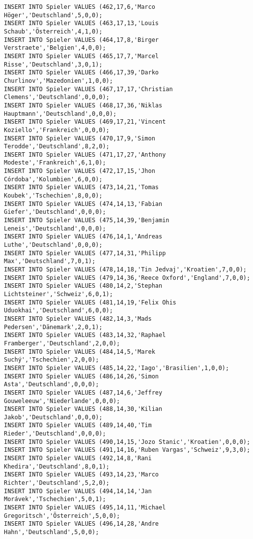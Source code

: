 \documentclass{bschlangaul-aufgabe}
\begin{document}
\begin{verbatim}
INSERT INTO Spieler VALUES (462,17,6,'Marco Höger','Deutschland',5,0,0);
INSERT INTO Spieler VALUES (463,17,13,'Louis Schaub','Österreich',4,1,0);
INSERT INTO Spieler VALUES (464,17,8,'Birger Verstraete','Belgien',4,0,0);
INSERT INTO Spieler VALUES (465,17,7,'Marcel Risse','Deutschland',3,0,1);
INSERT INTO Spieler VALUES (466,17,39,'Darko Churlinov','Mazedonien',1,0,0);
INSERT INTO Spieler VALUES (467,17,17,'Christian Clemens','Deutschland',0,0,0);
INSERT INTO Spieler VALUES (468,17,36,'Niklas Hauptmann','Deutschland',0,0,0);
INSERT INTO Spieler VALUES (469,17,21,'Vincent Koziello','Frankreich',0,0,0);
INSERT INTO Spieler VALUES (470,17,9,'Simon Terodde','Deutschland',8,2,0);
INSERT INTO Spieler VALUES (471,17,27,'Anthony Modeste','Frankreich',6,1,0);
INSERT INTO Spieler VALUES (472,17,15,'Jhon Córdoba','Kolumbien',6,0,0);
INSERT INTO Spieler VALUES (473,14,21,'Tomas Koubek','Tschechien',8,0,0);
INSERT INTO Spieler VALUES (474,14,13,'Fabian Giefer','Deutschland',0,0,0);
INSERT INTO Spieler VALUES (475,14,39,'Benjamin Leneis','Deutschland',0,0,0);
INSERT INTO Spieler VALUES (476,14,1,'Andreas Luthe','Deutschland',0,0,0);
INSERT INTO Spieler VALUES (477,14,31,'Philipp Max','Deutschland',7,0,1);
INSERT INTO Spieler VALUES (478,14,18,'Tin Jedvaj','Kroatien',7,0,0);
INSERT INTO Spieler VALUES (479,14,36,'Reece Oxford','England',7,0,0);
INSERT INTO Spieler VALUES (480,14,2,'Stephan Lichtsteiner','Schweiz',6,0,1);
INSERT INTO Spieler VALUES (481,14,19,'Felix Ohis Uduokhai','Deutschland',6,0,0);
INSERT INTO Spieler VALUES (482,14,3,'Mads Pedersen','Dänemark',2,0,1);
INSERT INTO Spieler VALUES (483,14,32,'Raphael Framberger','Deutschland',2,0,0);
INSERT INTO Spieler VALUES (484,14,5,'Marek Suchý','Tschechien',2,0,0);
INSERT INTO Spieler VALUES (485,14,22,'Iago','Brasilien',1,0,0);
INSERT INTO Spieler VALUES (486,14,26,'Simon Asta','Deutschland',0,0,0);
INSERT INTO Spieler VALUES (487,14,6,'Jeffrey Gouweleeuw','Niederlande',0,0,0);
INSERT INTO Spieler VALUES (488,14,30,'Kilian Jakob','Deutschland',0,0,0);
INSERT INTO Spieler VALUES (489,14,40,'Tim Rieder','Deutschland',0,0,0);
INSERT INTO Spieler VALUES (490,14,15,'Jozo Stanic','Kroatien',0,0,0);
INSERT INTO Spieler VALUES (491,14,16,'Ruben Vargas','Schweiz',9,3,0);
INSERT INTO Spieler VALUES (492,14,8,'Rani Khedira','Deutschland',8,0,1);
INSERT INTO Spieler VALUES (493,14,23,'Marco Richter','Deutschland',5,2,0);
INSERT INTO Spieler VALUES (494,14,14,'Jan Morávek','Tschechien',5,0,1);
INSERT INTO Spieler VALUES (495,14,11,'Michael Gregoritsch','Österreich',5,0,0);
INSERT INTO Spieler VALUES (496,14,28,'Andre Hahn','Deutschland',5,0,0);

\end{verbatim}
\end{document}
